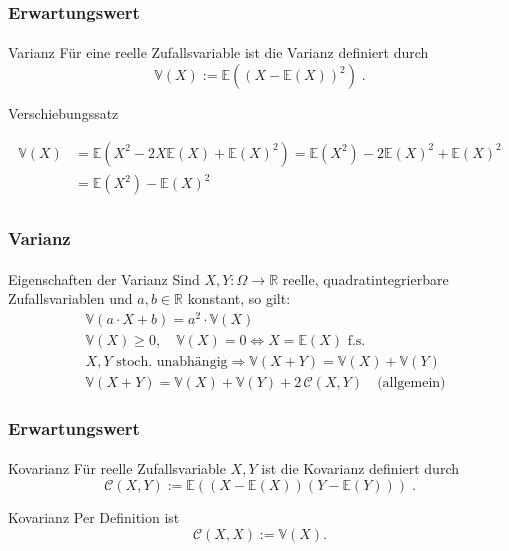 \documentclass{beamer}
\begin{document}
 \begin{frame}
    \frametitle{Erwartungswert}
\framesubtitle{}
\begin{block}{Varianz}
Für eine reelle Zufallsvariable ist die Varianz definiert durch
$$ \mathbb{V} (X) :=  \mathbb{E}( (X - \mathbb{E}(X))^2) \; .$$
\end{block}
\begin{block}{Verschiebungssatz}

\begin{align*}
 \mathbb{V}(X) & = \mathbb{E}(X^2 - 2X \mathbb{E}(X) + \mathbb{E}(X)^2) = \mathbb{E}(X^2) - 2 \mathbb{E}(X)^2 +  \mathbb{E}(X)^2 \\
& =  \mathbb{E}(X^2) -  \mathbb{E}(X)^2 \\
\end{align*}
\end{block}
 \end{frame}

 \begin{frame}
    \frametitle{Varianz}
\framesubtitle{}
\begin{block}{Eigenschaften der Varianz}
Sind $X,Y : \Omega \to \mathbb{R}$ reelle, quadratintegrierbare Zufallsvariablen und $a,b \in \mathbb{R}$ konstant, so gilt:
\begin{align*}
& \mathbb{V}(a \cdot X + b) = a^2 \cdot \mathbb{V}(X) \\
& \mathbb{V}(X) \geq 0, \quad \mathbb{V}(X) = 0 \Leftrightarrow X = \mathbb{E}(X) \text{ f.s.} \\
& X, Y \text{ stoch. unabhängig} \Rightarrow \mathbb{V}(X + Y) = \mathbb{V}(X) + \mathbb{V}(Y) \\
& \mathbb{V}(X + Y) = \mathbb{V}(X) + \mathbb{V}(Y) + 2\,\mathcal{C}(X,Y) \quad \text{(allgemein)}
\end{align*}
\end{block}
 \end{frame}

 \begin{frame}
    \frametitle{Erwartungswert}
\framesubtitle{}
\begin{block}{Kovarianz}
Für  reelle Zufallsvariable $X,Y$ ist die Kovarianz definiert durch
$$ \mathcal{C} (X,Y) :=  \mathbb{E}( (X - \mathbb{E}(X)) (Y - \mathbb{E}(Y))) \; .$$
\end{block}

\begin{block}{Kovarianz}
    Per Definition ist
    $$ \mathcal{C} (X,X) :=  \mathbb{V}(X).$$
    \end{block}
 \end{frame}
\end{document}
